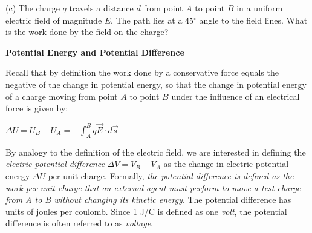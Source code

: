 (c) The charge $q$ travels a distance $d$ from point $A$ to point $B$ in a
uniform electric field of magnitude $E$. The path lies at a 45\( ^{\circ } \)
angle to the field lines. What is the work done by the field on the
charge?
\vspace{10mm}

\vspace{0.3cm}
{\centering {} \par}
\vspace{0.3cm}

\textbf{Potential Energy and Potential Difference}

Recall that by definition the work done by a conservative force equals
the negative of the change in potential energy, so that the change
in potential energy of a charge moving from point $A$ to point $B$ under
the influence of an electrical force is given by:

{\centering \( \Delta U=U_{B}-U_{A}=-\int ^{B}_{A}q\overrightarrow{E}\cdot d\overrightarrow{s} \)\par}

By analogy to the definition of the electric field, we are interested
in defining the \emph{electric potential difference} \( \Delta V=V_{B}-V_{A} \)
as the change in electric potential energy \( \Delta U \) per
unit charge. Formally, \emph{the potential difference is defined as
the work per unit charge that an external agent must perform to move
a test charge from A to B without changing its kinetic energy}. The
potential difference has units of joules per coulomb. Since 1 J/C
is defined as one \emph{volt}, the potential difference is often referred
to as \emph{voltage}.

